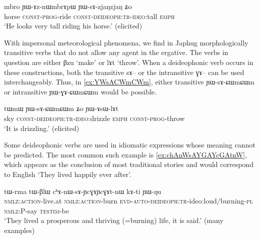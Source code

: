 \documentclass[oldfontcommands,oneside,a4paper,11pt]{article}
\newcommand{\ipa}[1]{{\phon \mbox{#1}}} %
\begin{document}
     \begin{exe}
     \ex \label{ex:YWsAzjaNzjaN2}
\gll
\ipa{mbro} 		\ipa{ɲɯ-ɤz-nɯmbrɤpɯ} \ipa{ɲɯ-sɤ-zjaŋzjaŋ} 	\ipa{ʑo} \\
horse  \textsc{const-prog}-ride \textsc{const-deideoph:tr-ideo}:tall \textsc{emph}\\
\glt `He looks very tall riding his horse.' (elicited)
\end{exe}

With impersonal meteorological phenomena, we find in Japhug morphologically transitive verbs that do not allow any agent in the ergative. The verbs in question are either \ipa{βzu} `make' or \ipa{lɤt} `throw'. When a deideophonic verb occurs in these constructions, both the transitive \ipa{sɤ--} or the intransitive \ipa{ɣɤ--} can be used interchangeably. Thus, in \ref{ex:YWsACWmCWm}, either transitive	\ipa{ɲɯ-sɤ-ɕɯmɕɯm} or 	intransitive \ipa{ɲɯ-ɣɤ-ɕɯmɕɯm} would be possible.

     \begin{exe}
     \ex \label{ex:YWsACWmCWm}
\gll
\ipa{tɯmɯ} 	\ipa{ɲɯ-sɤ-ɕɯmɕɯm} 	\ipa{ʑo} 	\ipa{ɲɯ-ɤsɯ-lɤt} \\
sky \textsc{const-deideoph:tr-ideo}:drizzle \textsc{emph} \textsc{const-prog}-throw \\
\glt `It is drizzling.' (elicited)
\end{exe}
 
Some deideophonic verbs are used in idiomatic expressions whose meaning cannot be predicted. The most common such example is \ref{ex:chAnWsAYGAYcGAtnW}, which appears as the conclusion of most traditional stories and would correspond to English `They lived happily ever after'.

     \begin{exe}
\ex \label{ex:chAnWsAYGAYcGAtnW}
\gll 
\ipa{tɯ-rma}  	\ipa{tɯ-βlɯ}  	\ipa{cʰɤ-nɯ-sɤ-ɲcɣɤɲcɣɤt-nɯ}  	\ipa{kɤ-ti}  	\ipa{ɲɯ-ŋu}  \\
\textsc{nmlz:action}-live.at \textsc{nmlz:action}-burn \textsc{evd-auto-deideoph:tr}-ideo:loud/burning-\textsc{pl} \textsc{nmlz}:P-say \textsc{testim}-be \\
\glt  `They lived a prosperous and thriving (=burning) life, it is said.' (many examples)
\end{exe}


 	  
\end{document}
